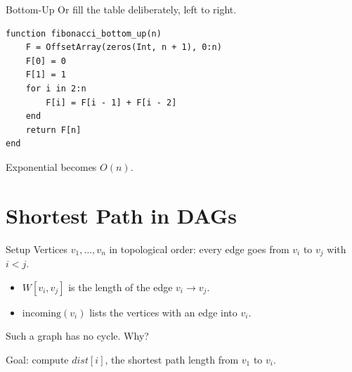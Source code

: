 \documentclass[10pt,aspectratio=169]{beamer}
\begin{document}
\begin{frame}[fragile]{Bottom-Up}
  Or fill the table deliberately, left to right.

  \begin{lstlisting}
function fibonacci_bottom_up(n)
    F = OffsetArray(zeros(Int, n + 1), 0:n)
    F[0] = 0
    F[1] = 1
    for i in 2:n
        F[i] = F[i - 1] + F[i - 2]
    end
    return F[n]
end
  \end{lstlisting}

  \bigskip
  \begin{center}
  \end{center}

  \begin{center}
    Exponential becomes $O(n)$.
  \end{center}
\end{frame}

\section{Shortest Path in DAGs}

\begin{frame}{Setup}
  Vertices $v_1, \ldots, v_n$ in \alert{topological order}: every edge goes
  from $v_i$ to $v_j$ with $i < j$.

  \bigskip
  \begin{itemize}
    \item $W[v_i, v_j]$ is the length of the edge $v_i \to v_j$.
    \item $\text{incoming}(v_i)$ lists the vertices with an edge into $v_i$.
  \end{itemize}

  \bigskip
  \begin{center}
    Such a graph has no cycle. Why?
  \end{center}

  \bigskip
  \begin{center}
    \small Goal: compute $dist[i]$, the shortest path length from $v_1$ to $v_i$.
  \end{center}
\end{frame}
\end{document}
